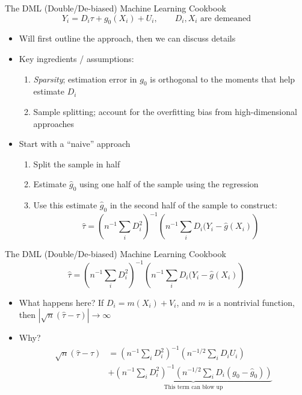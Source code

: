   \begin{frame}{The DML (Double/De-biased) Machine Learning Cookbook}
    $$Y_{i} = D_{i}\tau + g_{0}(X_{i}) + U_{i}, \qquad D_{i}, X_{i} \text{ are demeaned}$$  
    \begin{itemize}
    \item Will first outline the approach, then we can discuss details
    \item Key ingredients / assumptions:
      \begin{enumerate}
      \item \emph{Sparsity}; estimation error in $g_{0}$ is orthogonal
        to the moments that help estimate $D_{i}$
      \item Sample splitting; account for the overfitting bias from
        high-dimensional approaches
      \end{enumerate}
    \item Start with a ``naive'' approach
      \begin{enumerate}
      \item Split the sample in half
      \item Estimate $\hat{g}_{0}$ using one half of the sample using the regression
      \item Use this estimate $\hat{g}_{0}$ in the second half of the sample to construct:
        $$\hat{\tau} = \left(n^{-1}\sum_{i}D^{2}_{i}\right)^{-1}\left(n^{-1}\sum_{i}D_{i}(Y_{i} - \hat{g}(X_{i})\right)$$      
      \end{enumerate}
    \end{itemize}
  \end{frame}
  
  \begin{frame}{The DML (Double/De-biased) Machine Learning Cookbook}
    $$\hat{\tau} = \left(n^{-1}\sum_{i}D^{2}_{i}\right)^{-1}\left(n^{-1}\sum_{i}D_{i}(Y_{i} - \hat{g}(X_{i})\right)$$
    \begin{itemize}
    \item What happens here? If $D_{i} = m(X_{i}) + V_{i}$, and $m$ is a
      nontrivial function, then $|\sqrt{n}(\hat{\tau} - \tau)| \rightarrow \infty$
    \item Why?
      \begin{align*}
        \sqrt{n}(\hat{\tau} - \tau) &= \left(n^{-1}\sum_{i}D^{2}_{i}\right)^{-1}\left(n^{-1/2}\sum_{i}D_{i}U_{i}\right) \\
        &+ \underbrace{\left(n^{-1}\sum_{i}D^{2}_{i}\right)^{-1}\left(n^{-1/2}\sum_{i}D_{i}(g_{0} - \hat{g}_{0})\right)}_{\text{This term can blow up}}
        \end{align*}
    \end{itemize}
  \end{frame}
  
